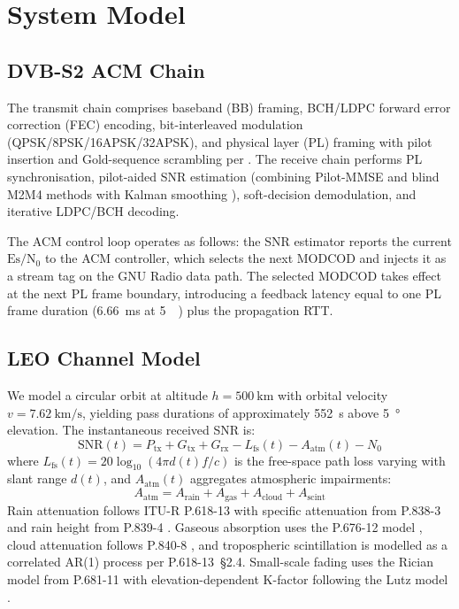 \documentclass[conference]{IEEEtran}
\begin{document}
\section{System Model}

\subsection{DVB-S2 ACM Chain}

The transmit chain comprises baseband (BB) framing, BCH/LDPC forward error correction (FEC) encoding, bit-interleaved modulation (QPSK/8PSK/16APSK/32APSK), and physical layer (PL) framing with pilot insertion and Gold-sequence scrambling per \cite{etsi_dvbs2}. The receive chain performs PL synchronisation, pilot-aided SNR estimation (combining Pilot-MMSE and blind M2M4 methods with Kalman smoothing \cite{pauluzzi2000}), soft-decision demodulation, and iterative LDPC/BCH decoding.

The ACM control loop operates as follows: the SNR estimator reports the current $\text{Es}/\text{N}_0$ to the ACM controller, which selects the next MODCOD and injects it as a stream tag on the GNU Radio data path. The selected MODCOD takes effect at the next PL frame boundary, introducing a feedback latency equal to one PL frame duration (\SI{6.66}{\milli\second} at \SI{5}{\mega{}}) plus the propagation RTT.

\subsection{LEO Channel Model}

We model a circular orbit at altitude $h = \SI{500}{\kilo\metre}$ with orbital velocity $v = \SI{7.62}{\kilo\metre\per\second}$, yielding pass durations of approximately \SI{552}{\second} above \SI{5}{\degree} elevation. The instantaneous received SNR is:
\begin{equation}
\text{SNR}(t) = P_\text{tx} + G_\text{tx} + G_\text{rx} - L_\text{fs}(t) - A_\text{atm}(t) - N_0
\label{eq:snr}
\end{equation}
where $L_\text{fs}(t) = 20\log_{10}(4\pi d(t)f/c)$ is the free-space path loss varying with slant range $d(t)$, and $A_\text{atm}(t)$ aggregates atmospheric impairments:
\begin{equation}
A_\text{atm} = A_\text{rain} + A_\text{gas} + A_\text{cloud} + A_\text{scint}
\end{equation}
Rain attenuation follows ITU-R P.618-13 \cite{itu_p618} with specific attenuation from P.838-3 \cite{itu_p838} and rain height from P.839-4 \cite{itu_p839}. Gaseous absorption uses the P.676-12 model \cite{itu_p676}, cloud attenuation follows P.840-8 \cite{itu_p840}, and tropospheric scintillation is modelled as a correlated AR(1) process per P.618-13~\S2.4. Small-scale fading uses the Rician model from P.681-11 \cite{itu_p681} with elevation-dependent K-factor following the Lutz model \cite{lutz1991}.
\end{document}
